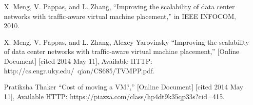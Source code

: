 \documentclass[11pt]{article}
\begin{document}
\begin{thebibliography}{9}

  X. Meng, V. Pappas, and L. Zhang, “Improving the scalability of data
center networks with trafﬁc-aware virtual machine placement,” in IEEE
INFOCOM, 2010.

X. Meng, V. Pappas, and L. Zhang, Alexey Yarovinsky “Improving the scalability of data
center networks with trafﬁc-aware virtual machine placement,” [Online Document] [cited 2014 May 11], Available HTTP: http://cs.engr.uky.edu/~qian/CS685/TVMPP.pdf.

 Pratiksha Thaker “Cost of moving a VM?,” [Online Document] [cited 2014 May 11], Available HTTP: https://piazza.com/class/hp4dt9k35qp33s?cid=415.

\end{thebibliography}
\end{document}
